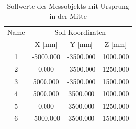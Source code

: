 \begin{table}[h]\label{tab:sollwertemitte}
\centering
\caption{Sollwerte des Messobjekts mit Ursprung in der Mitte}

\begin{tabular}{cccc}
\toprule
\multicolumn{1}{c|}{Name} &
\multicolumn{3}{c}{Soll-Koordinaten} \\
\multicolumn{1}{c|}{} &
\multicolumn{1}{c|}{X [mm]} &
\multicolumn{1}{c|}{Y [mm]} &
\multicolumn{1}{c}{Z [mm]} \\
\midrule

\multicolumn{1}{c|}{1} &
\multicolumn{1}{c|}{-5000.000} &
\multicolumn{1}{c|}{-3500.000} &
\multicolumn{1}{c}{1000.000} \\

\multicolumn{1}{c|}{2} &
\multicolumn{1}{c|}{0.000} &
\multicolumn{1}{c|}{-3500.000} &
\multicolumn{1}{c}{1250.000} \\

\multicolumn{1}{c|}{3} &
\multicolumn{1}{c|}{5000.000} &
\multicolumn{1}{c|}{-3500.000} &
\multicolumn{1}{c}{1500.000} \\

\multicolumn{1}{c|}{4} &
\multicolumn{1}{c|}{5000.000} &
\multicolumn{1}{c|}{3500.000} &
\multicolumn{1}{c}{1000.000} \\

\multicolumn{1}{c|}{5} &
\multicolumn{1}{c|}{0.000} &
\multicolumn{1}{c|}{3500.000} &
\multicolumn{1}{c}{1250.000} \\

\multicolumn{1}{c|}{6} &
\multicolumn{1}{c|}{-5000.000} &
\multicolumn{1}{c|}{3500.000} &
\multicolumn{1}{c}{1500.000} \\
\bottomrule
\end{tabular}
\end{table}

